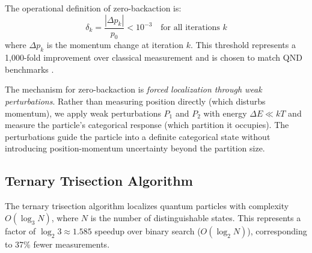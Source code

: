 \documentclass[twocolumn,10pt]{article}
\begin{document}
The operational definition of zero-backaction is:
%
\begin{equation}
\delta_k = \frac{|\Delta p_k|}{p_0} < 10^{-3} \quad \text{for all iterations } k
\label{eq:zero_backaction}
\end{equation}
%
where $\Delta p_k$ is the momentum change at iteration $k$. This threshold 
represents a 1,000-fold improvement over classical measurement and is chosen to 
match QND benchmarks \cite{Brune1990}.

The mechanism for zero-backaction is \textit{forced localization through weak 
perturbations}. Rather than measuring position directly (which disturbs momentum), 
we apply weak perturbations $P_1$ and $P_2$ with energy $\Delta E \ll kT$ and 
measure the particle's categorical response (which partition it occupies). The 
perturbations guide the particle into a definite categorical state without 
introducing position-momentum uncertainty beyond the partition size.


\subsection{Ternary Trisection Algorithm}

The ternary trisection algorithm \cite{Sachikonye2026c} localizes quantum 
particles with complexity $O(\log_3 N)$, where $N$ is the number of distinguishable 
states. This represents a factor of $\log_2 3 \approx 1.585$ speedup over binary 
search ($O(\log_2 N)$), corresponding to 37\% fewer measurements.
\end{document}
